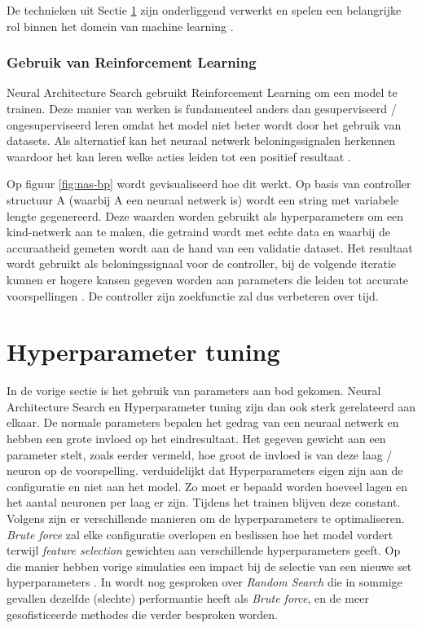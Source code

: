 De technieken uit Sectie \ref{sec:hyperparameter-tuning} zijn onderliggend verwerkt en spelen een belangrijke rol binnen het domein van machine learning \autocite{ZophL2016}.

\subsubsection{Gebruik van Reinforcement Learning}
\label{subsubsec:nas-reinforcement}

Neural Architecture Search gebruikt Reinforcement Learning om een model te trainen. Deze manier van werken is fundamenteel anders dan gesuperviseerd / ongesuperviseerd leren omdat het model niet beter wordt door het gebruik van datasets. Als alternatief kan het neuraal netwerk beloningssignalen herkennen waardoor het kan leren welke acties leiden tot een positief resultaat \autocite{Lievens2019}.

Op figuur \ref{fig:nas-bp} wordt gevisualiseerd hoe dit werkt. Op basis van controller structuur A (waarbij A een neuraal netwerk is) wordt een string met variabele lengte gegenereerd. Deze waarden worden gebruikt als hyperparameters om een kind-netwerk aan te maken, die getraind wordt met echte data en waarbij de accuraatheid gemeten wordt aan de hand van een validatie dataset. Het resultaat wordt gebruikt als beloningssignaal voor de controller, bij de volgende iteratie kunnen er hogere kansen gegeven worden aan parameters die leiden tot accurate voorspellingen \autocite{ZophL2016}. De controller zijn zoekfunctie zal dus verbeteren over tijd.

\section{Hyperparameter tuning}
\label{sec:hyperparameter-tuning}

In de vorige sectie is het gebruik van parameters aan bod gekomen. Neural Architecture Search en Hyperparameter tuning zijn dan ook sterk gerelateerd aan elkaar. De normale parameters bepalen het gedrag van een neuraal netwerk en hebben een grote invloed op het eindresultaat. Het gegeven gewicht aan een parameter stelt, zoals eerder vermeld, hoe groot de invloed is van deze laag / neuron op de voorspelling. \textcite{GoogleHT2020} verduidelijkt dat Hyperparameters eigen zijn aan de configuratie en niet aan het model. Zo moet er bepaald worden hoeveel lagen en het aantal neuronen per laag er zijn. Tijdens het trainen blijven deze constant. Volgens \textcite{Brust2019} zijn er verschillende manieren om de hyperparameters te optimaliseren. \textit{Brute force} zal elke configuratie overlopen en beslissen hoe het model vordert terwijl \textit{feature selection} gewichten aan verschillende hyperparameters geeft. Op die manier hebben vorige simulaties een impact bij de selectie van een nieuwe set hyperparameters \autocite{Claesen2015}. In \textcite{Bergstra2011} wordt nog gesproken over \textit{Random Search} die in sommige gevallen dezelfde (slechte) performantie heeft als \textit{Brute force}, en de meer gesofisticeerde methodes die verder besproken worden. 

